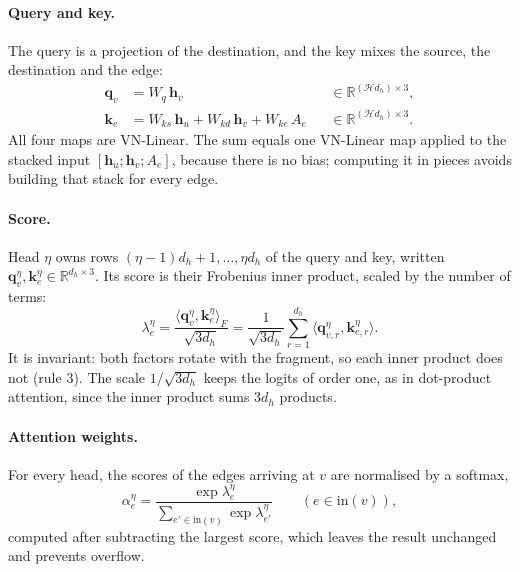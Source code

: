 \documentclass[11pt,a4paper]{article}
\theoremstyle{remark}
\newcommand{\R}{\mathbb{R}}
\newcommand{\ip}[2]{\langle #1,#2\rangle}
\begin{document}
\paragraph{Query and key.} The query is a projection of the destination, and the key mixes the source, the destination and the edge:
\begin{align}
  \mathbf q_v&=W_q\,\mathbf h_v &&\in\R^{(\mathcal Hd_h)\times3},\\
  \mathbf k_e&=W_{ks}\,\mathbf h_u+W_{kd}\,\mathbf h_v+W_{ke}\,A_e &&\in\R^{(\mathcal Hd_h)\times3}.
\end{align}
All four maps are VN-Linear. The sum equals one VN-Linear map applied to the stacked input $[\mathbf h_u;\mathbf h_v;A_e]$, because there is no bias; computing it in pieces avoids building that stack for every edge.

\paragraph{Score.} Head $\eta$ owns rows $(\eta-1)d_h+1,\dots,\eta d_h$ of the query and key, written $\mathbf q_v^\eta,\mathbf k_e^\eta\in\R^{d_h\times3}$. Its score is their Frobenius inner product, scaled by the number of terms:
\begin{equation}
  \lambda_e^\eta=\frac{\ip{\mathbf q_v^\eta}{\mathbf k_e^\eta}_F}{\sqrt{3d_h}}
  =\frac1{\sqrt{3d_h}}\sum_{r=1}^{d_h}\ip{\mathbf q_{v,r}^\eta}{\mathbf k_{e,r}^\eta}.
\end{equation}
It is invariant: both factors rotate with the fragment, so each inner product does not (rule 3). The scale $1/\sqrt{3d_h}$ keeps the logits of order one, as in dot-product attention, since the inner product sums $3d_h$ products.

\paragraph{Attention weights.} For every head, the scores of the edges arriving at $v$ are normalised by a softmax,
\begin{equation}
  \alpha_e^\eta=\frac{\exp\lambda_e^\eta}{\sum_{e'\in\mathrm{in}(v)}\exp\lambda_{e'}^\eta}\qquad(e\in\mathrm{in}(v)),
\end{equation}
computed after subtracting the largest score, which leaves the result unchanged and prevents overflow.
\end{document}
